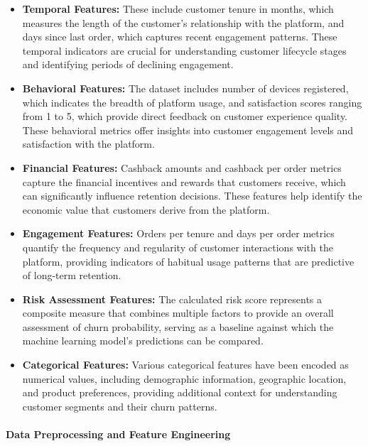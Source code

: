 \documentclass{article}
\begin{document}
\begin{itemize}
    \item \textbf{Temporal Features:} These include customer tenure in months, which measures the length of the customer's relationship with the platform, and days since last order, which captures recent engagement patterns. These temporal indicators are crucial for understanding customer lifecycle stages and identifying periods of declining engagement.
    
    \item \textbf{Behavioral Features:} The dataset includes number of devices registered, which indicates the breadth of platform usage, and satisfaction scores ranging from 1 to 5, which provide direct feedback on customer experience quality. These behavioral metrics offer insights into customer engagement levels and satisfaction with the platform.
    
    \item \textbf{Financial Features:} Cashback amounts and cashback per order metrics capture the financial incentives and rewards that customers receive, which can significantly influence retention decisions. These features help identify the economic value that customers derive from the platform.
    
    \item \textbf{Engagement Features:} Orders per tenure and days per order metrics quantify the frequency and regularity of customer interactions with the platform, providing indicators of habitual usage patterns that are predictive of long-term retention.
    
    \item \textbf{Risk Assessment Features:} The calculated risk score represents a composite measure that combines multiple factors to provide an overall assessment of churn probability, serving as a baseline against which the machine learning model's predictions can be compared.
    
    \item \textbf{Categorical Features:} Various categorical features have been encoded as numerical values, including demographic information, geographic location, and product preferences, providing additional context for understanding customer segments and their churn patterns.
\end{itemize}

\paragraph{Data Preprocessing and Feature Engineering}
\end{document}
